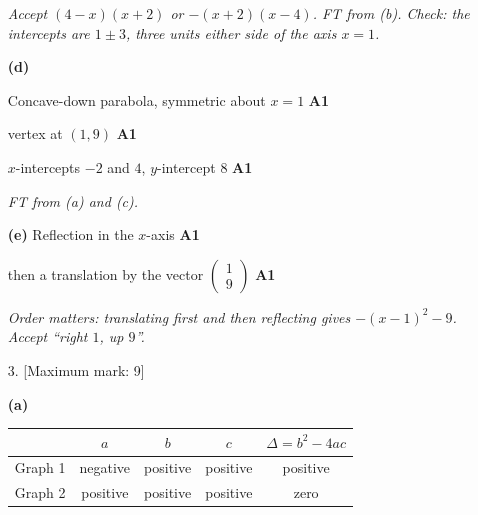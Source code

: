 \documentclass[12pt, twoside]{article}
\begin{document}
\begin{enumerate}[itemsep=0.3cm]
\emph{Accept $(4 - x)(x + 2)$ or $-(x + 2)(x - 4)$. FT from (b). Check: the
intercepts are $1 \pm 3$, three units either side of the axis $x = 1$.}

\textbf{(d)}

\begin{center}
\end{center}

Concave-down parabola, symmetric about $x = 1$ \hfill \textbf{A1}

vertex at $(1, 9)$ \hfill \textbf{A1}

$x$-intercepts $-2$ and $4$, $y$-intercept $8$ \hfill \textbf{A1}

\emph{FT from (a) and (c).}

\textbf{(e)} Reflection in the $x$-axis \hfill \textbf{A1}

then a translation by the vector $\begin{pmatrix} 1 \\ 9 \end{pmatrix}$ \hfill \textbf{A1}

\emph{Order matters: translating first and then reflecting gives
$-(x - 1)^{2} - 9$. Accept ``right $1$, up $9$''.}

\newpage

\item[3.] [Maximum mark: 9]

\textbf{(a)}

\begin{center}
\renewcommand{\arraystretch}{1.5}
\begin{tabular}{|l|c|c|c|c|}
\hline
 & $a$ & $b$ & $c$ & $\Delta = b^{2} - 4ac$ \\
\hline
Graph 1 & negative & positive & positive & positive \\
\hline
Graph 2 & positive & positive & positive & zero \\
\hline
\end{tabular}
\end{center}


\end{enumerate}
\end{document}
